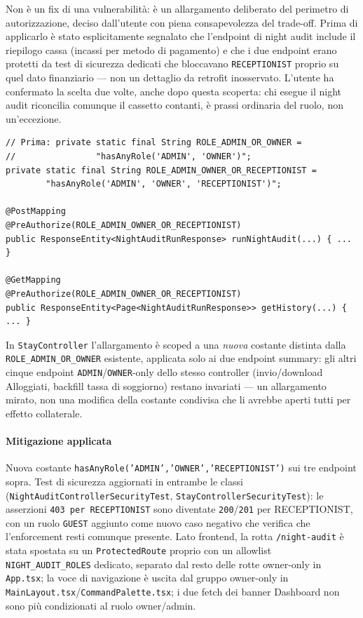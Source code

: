 ﻿\documentclass[a4paper,12pt]{report}
\begin{document}
Non è un fix di una vulnerabilità: è un allargamento deliberato del perimetro di
autorizzazione, deciso dall'utente con piena consapevolezza del trade-off. Prima di
applicarlo è stato esplicitamente segnalato che l'endpoint di night audit include il
riepilogo cassa (incassi per metodo di pagamento) e che i due endpoint erano protetti da
test di sicurezza dedicati che bloccavano \texttt{RECEPTIONIST} proprio su quel dato
finanziario --- non un dettaglio da retrofit inosservato. L'utente ha confermato la
scelta due volte, anche dopo questa scoperta: chi esegue il night audit riconcilia
comunque il cassetto contanti, è prassi ordinaria del ruolo, non un'eccezione.

\begin{securebox}[title={NightAuditController.java --- costante di ruolo dedicata (main)}]
\begin{lstlisting}[style=java]
// Prima: private static final String ROLE_ADMIN_OR_OWNER =
//                "hasAnyRole('ADMIN', 'OWNER')";
private static final String ROLE_ADMIN_OWNER_OR_RECEPTIONIST =
        "hasAnyRole('ADMIN', 'OWNER', 'RECEPTIONIST')";

@PostMapping
@PreAuthorize(ROLE_ADMIN_OWNER_OR_RECEPTIONIST)
public ResponseEntity<NightAuditRunResponse> runNightAudit(...) { ... }

@GetMapping
@PreAuthorize(ROLE_ADMIN_OWNER_OR_RECEPTIONIST)
public ResponseEntity<Page<NightAuditRunResponse>> getHistory(...) { ... }
\end{lstlisting}
\end{securebox}

In \texttt{StayController} l'allargamento è scoped a una \emph{nuova} costante distinta
dalla \texttt{ROLE\_ADMIN\_OR\_OWNER} esistente, applicata solo ai due endpoint summary:
gli altri cinque endpoint \texttt{ADMIN}/\texttt{OWNER}-only dello stesso controller
(invio/download Alloggiati, backfill tassa di soggiorno) restano invariati --- un
allargamento mirato, non una modifica della costante condivisa che li avrebbe aperti
tutti per effetto collaterale.

\paragraph{Mitigazione applicata}
Nuova costante \texttt{hasAnyRole('ADMIN','OWNER','RECEPTIONIST')} sui tre endpoint
sopra. Test di sicurezza aggiornati in entrambe le classi
(\texttt{NightAuditControllerSecurityTest}, \texttt{StayControllerSecurityTest}): le
asserzioni \texttt{403 per RECEPTIONIST} sono diventate \texttt{200}/\texttt{201} per
RECEPTIONIST, con un ruolo \texttt{GUEST} aggiunto come nuovo caso negativo che verifica
che l'enforcement resti comunque presente. Lato frontend, la rotta \texttt{/night-audit}
è stata spostata su un \texttt{ProtectedRoute} proprio con un allowlist
\texttt{NIGHT\_AUDIT\_ROLES} dedicato, separato dal resto delle rotte owner-only in
\texttt{App.tsx}; la voce di navigazione è uscita dal gruppo owner-only in
\texttt{MainLayout.tsx}/\texttt{CommandPalette.tsx}; i due fetch dei banner Dashboard non
sono più condizionati al ruolo owner/admin.
\end{document}
